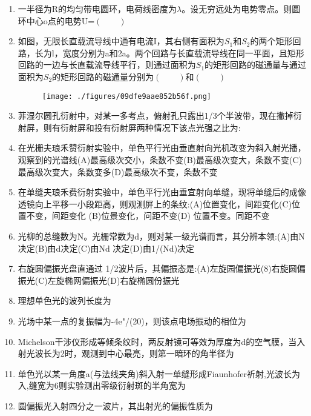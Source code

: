 \begin{enumerate}
\item 一半径为R的均匀带电圆环，电荷线密度为$\lambda$。设无穷远处为电势零点。则圆环中心o点的电势U=$(\qquad)$
\item 如图，无限长直载流导线中通有电流I，其右侧有面积为$S_1$和$S_2$的两个矩形回路，长为l，宽度分别为a和2a。两个回路与长直载流导线在同一平面，且矩形回路的一边与长直载流导线平行，则通过面积为$S_1$的矩形回路的磁通量与通过面积为$S_2$的矩形回路的磁通量分别为$(\qquad)$和$(\qquad)$
\begin{figure}[ht]
\centering
\texttt{[image: ./figures/09dfe9aae852b56f.png]}
\caption{} \label{fig_HDSD13_5}
\end{figure}
\item 菲湿尔圆孔衍射中，对某一多考点，俯射孔只露出1/3个半波带，现在撇掉衍射屏，则有衍射屏和投有衍射屏两种情况下该点光强之比为:
\item 在光栅夫琅禾赞衍射实验中，单色平行光由垂直射向光机改变为斜入射光播，观察到的光谱线(A)最高级次交小，条数不变(B)最高级次变大，条数不变(C)最高级次变大，条数变多(D)最高级次不变，条数不变
\item 在单缝夫琅禾费衍射实验中，单色平行光由垂宜射向单缝，现将单缝后的成像透镜向上平移一小段距高，则观测屏上的条纹:(A)位置变化，间距变化(C)位置不变，间距变化
(B)位景变化，问距不变(D) 位置不变。同距不变
\item 光柳的总缝数为N。光栅常数为d，则对某一级光谱而言，其分辨本领:(A)由N决定(B)由d决定(C)由Nd 决定(D)由1/(Nd)决定
\item 右旋圆偏振光盘直通过 1/2波片后，其偏振态是:(A)左旋园偏振光(8)右旋圆偏振光(C)左旋椭网偏振光(D)右旋椭圆份振光
\item 理想单色光的波列长度为
\item 光场中某一点的复振幅为-4e"/(20)，则该点电场振动的相位为
\item Michelson干涉仪形成等倾条纹时，两反射镜可等效为厚度为d的空气膜，当入射光波长为2时，观测到中心最亮，则第一暗环的角半径为
\item 单色光以某一角度a(与法线夹角)斜入射一单缝形成Fiaunhofer祈射,光波长为入,缝宽为6则实验测出零级衍射斑的半角宽为
\item 圆偏振光入射四分之一波片，其出射光的偏振性质为
\end{enumerate}
